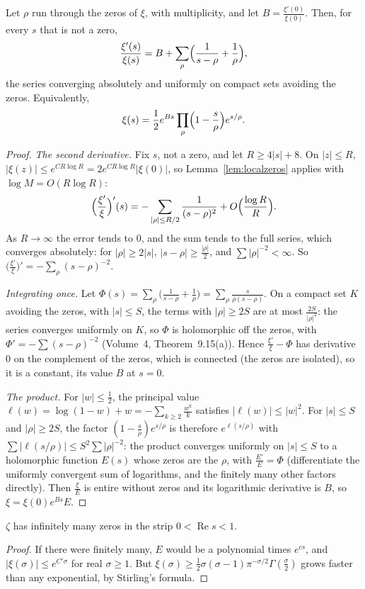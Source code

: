 \begin{theorem}[Hadamard, 1893]\label{thm:hadamard}
Let $\rho$ run through the zeros of $\xi$, with multiplicity, and let $B=\frac{\xi'(0)}{\xi(0)}$. Then, for every $s$ that is not a zero,
\[
\frac{\xi'(s)}{\xi(s)}=B+\sum_\rho\Bigl(\frac1{s-\rho}+\frac1\rho\Bigr),
\]
the series converging absolutely and uniformly on compact sets avoiding the zeros. Equivalently,
\[
\xi(s)=\frac12e^{Bs}\prod_\rho\Bigl(1-\frac s\rho\Bigr)e^{s/\rho}.
\]
\end{theorem}
\begin{proof}
\emph{The second derivative.} Fix $s$, not a zero, and let $R\ge4|s|+8$. On $|z|\le R$, $|\xi(z)|\le e^{CR\log R}=2e^{CR\log R}|\xi(0)|$, so Lemma~\ref{lem:localzeros} applies with $\log M=O(R\log R)$:
\[
\Bigl(\frac{\xi'}\xi\Bigr)'(s)=-\sum_{|\rho|\le R/2}\frac1{(s-\rho)^2}+O\Bigl(\frac{\log R}R\Bigr).
\]
As $R\to\infty$ the error tends to $0$, and the sum tends to the full series, which converges absolutely: for $|\rho|\ge2|s|$, $|s-\rho|\ge\frac{|\rho|}2$, and $\sum|\rho|^{-2}<\infty$. So
$\bigl(\frac{\xi'}\xi\bigr)'=-\sum_\rho(s-\rho)^{-2}$.

\emph{Integrating once.} Let $\Phi(s)=\sum_\rho\bigl(\frac1{s-\rho}+\frac1\rho\bigr)=\sum_\rho\frac s{\rho(s-\rho)}$. On a compact set $K$ avoiding the zeros, with $|s|\le S$, the terms with $|\rho|\ge2S$ are at
most $\frac{2S}{|\rho|^2}$: the series converges uniformly on $K$, so $\Phi$ is holomorphic off the zeros, with $\Phi'=-\sum(s-\rho)^{-2}$ (Volume~4, Theorem~9.15(a)). Hence
$\frac{\xi'}\xi-\Phi$ has derivative $0$ on the complement of the zeros, which is connected (the zeros are isolated), so it is a constant, its value $B$ at $s=0$.

\emph{The product.} For $|w|\le\frac12$, the principal value $\ell(w)=\log(1-w)+w=-\sum_{k\ge2}\frac{w^k}k$ satisfies $|\ell(w)|\le|w|^2$. For $|s|\le S$ and $|\rho|\ge2S$, the factor
$(1-\frac s\rho)e^{s/\rho}$ is therefore $e^{\ell(s/\rho)}$ with $\sum|\ell(s/\rho)|\le S^2\sum|\rho|^{-2}$: the product converges uniformly on $|s|\le S$ to a holomorphic function $E(s)$ whose zeros are
the $\rho$, with $\frac{E'}E=\Phi$ (differentiate the uniformly convergent sum of logarithms, and the finitely many other factors directly). Then $\frac\xi E$ is entire without zeros and its
logarithmic derivative is $B$, so $\xi=\xi(0)e^{Bs}E$.
\end{proof}

\begin{corollary}\label{cor:infinitezeros}
$\zeta$ has infinitely many zeros in the strip $0<\operatorname{Re}s<1$.
\end{corollary}
\begin{proof}
If there were finitely many, $E$ would be a polynomial times $e^{cs}$, and $|\xi(\sigma)|\le e^{C'\sigma}$ for real $\sigma\ge1$. But $\xi(\sigma)\ge\frac12\sigma(\sigma-1)\pi^{-\sigma/2}\Gamma(\frac\sigma2)$ grows faster
than any exponential, by Stirling's formula.
\end{proof}

